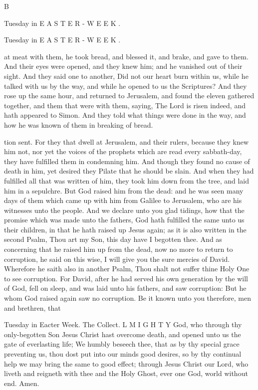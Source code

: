 B

Tuesday in E A S T E R - W E E K .

Tuesday in E A S T E R - W E E K .

at meat with them, he took bread, and blessed it, and brake, and gave to them. And their eyes were opened, and they knew him; and he vanished out of their sight. And they said one to another, Did not our heart burn within us, while he talked with us by the way, and while he opened to us the Scriptures? And they rose up the same hour, and returned to Jerusalem, and found the eleven gathered together, and them that were with them, saying, The Lord is risen indeed, and hath appeared to Simon. And they told what things were done in the way, and how he was known of them in breaking of bread.

tion sent. For they that dwell at Jerusalem, and their rulers, because they knew him not, nor yet the voices of the prophets which are read every sabbath-day, they have fulfilled them in condemning him. And though they found no cause of death in him, yet desired they Pilate that he should be slain. And when they had fulfilled all that was written of him, they took him down from the tree, and laid him in a sepulchre. But God raised him from the dead: and he was seen many days of them which came up with him from Galilee to Jerusalem, who are his witnesses unto the people. And we declare unto you glad tidings, how that the promise which was made unto the fathers, God hath fulfilled the same unto us their children, in that he hath raised up Jesus again; as it is also written in the second Psalm, Thou art my Son, this day have I begotten thee. And as concerning that he raised him up from the dead, now no more to return to corruption, he said on this wise, I will give you the sure mercies of David. Wherefore he saith also in another Psalm, Thou shalt not suffer thine Holy One to see corruption. For David, after he had served his own generation by the will of God, fell on sleep, and was laid unto his fathers, and saw corruption: But he whom God raised again saw no corruption. Be it known unto you therefore, men and brethren, that

Tuesday in Eacter Week. The Collect. L M I G H T Y God, who through thy only-begotten Son Jesus Christ hast overcome death, and opened unto us the gate of everlasting life; We humbly beseech thee, that as by thy special grace preventing us, thou dost put into our minds good desires, so by thy continual help we may bring the same to good effect; through Jesus Christ our Lord, who liveth and reigneth with thee and the Holy Ghost, ever one God, world without end. Amen.

